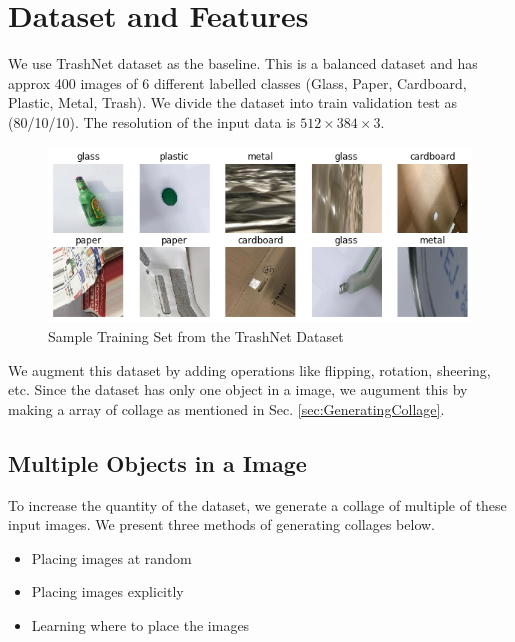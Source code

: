 \documentclass{article}
\begin{document}



\section{Dataset and Features}
We use TrashNet \citep{yang2016classification} dataset as the baseline. This is a balanced dataset and has approx 400 images of 6 different labelled classes (Glass, Paper, Cardboard, Plastic, Metal, Trash).  We divide the dataset into train \/ validation \/ test as (80/10/10). The resolution of the input data is $512\times384\times3$.

\begin{figure}[h!]
    \centering
    \includegraphics[width=0.8\linewidth]{data/images/03_Dataset/train_sample.png}
    \caption{Sample Training Set from the TrashNet Dataset \cite{yang2016classification}}
    \label{fig:TrainSample}
\end{figure}

We augment this dataset by adding operations like flipping, rotation, sheering, etc.  Since the dataset has only one object in a image, we augument this by making a array of collage as mentioned in Sec. \ref{sec:GeneratingCollage}. 


\subsection{Multiple Objects in a Image}
To increase the quantity of the dataset, we generate a collage of multiple of these input images. We present three methods of generating collages below. 
\begin{itemize}
    \item Placing images at random
    \item Placing images explicitly
    \item Learning where to place the images
\end{itemize}
\end{document}
